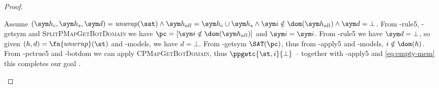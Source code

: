 \begin{proof}

\begin{hypvlist}
 Assume $(\sym h_c,\sym h_s,\sym d)=\mathit{unwrap}(\sst) \land \sym h_{all}=\sym h_c\cup \sym h_s \land \sym i\notin \dom(\sym h_{all}) \land \sym d=\bot$.
 From \hyp{rule5}, \hyp{getsym} and \textsc{SplitPMapGetBotDomain} we have $\pc=[\sym i\notin\dom(\sym h_{all})]$ and $\sym i=\sym i$.
 From \hyp{rule5} we have $\sym d=\bot$, so given $(h,d)=\fn{unwrap}(\st)$ and \hyp{models}, we have $d=\bot$.%
 From \hyp{getsym} $\SAT(\pc)$, thus from \hyp{apply5} and \hyp{models}, $i\notin \dom(h)$.
 From \hyp{pctrue5} and \hyp{botdom} we can apply \textsc{CPMapGetBotDomain}, thus ${\ppgetc{\st,i}{\bot}}$ -- together with \hyp{apply5} and \ref{eq:empty-mem} this completes our goal .
\end{hypvlist}

\end{proof}
